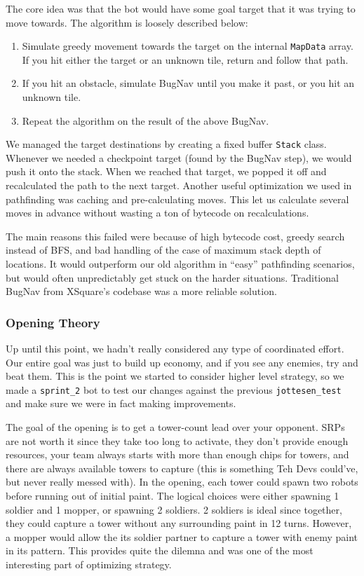 The core idea was that the bot would have some goal target that it was trying to move towards. The algorithm is loosely described below:
\begin{enumerate}
  \item Simulate greedy movement towards the target on the internal \verb|MapData| array. If you hit either the target or an unknown tile, return and follow that path.
  \item If you hit an obstacle, simulate BugNav until you make it past, or you hit an unknown tile.
  \item Repeat the algorithm on the result of the above BugNav.
\end{enumerate}
We managed the target destinations by creating a fixed buffer \verb|Stack| class. Whenever we needed a checkpoint target (found by the BugNav step), we would push it onto the stack. When we reached that target, we popped it off and recalculated the path to the next target. Another useful optimization we used in pathfinding was caching and pre-calculating moves. This let us calculate several moves in advance without wasting a ton of bytecode on recalculations.

\medskip

The main reasons this failed were because of high bytecode cost, greedy search instead of BFS, and bad handling of the case of maximum stack depth of locations. It would outperform our old algorithm in ``easy'' pathfinding scenarios, but would often unpredictably get stuck on the harder situations. Traditional BugNav from XSquare's codebase was a more reliable solution.

\subsubsection{Opening Theory}

Up until this point, we hadn't really considered any type of coordinated effort. Our entire goal was just to build up economy, and if you see any enemies, try and beat them. This is the point we started to consider higher level strategy, so we made a \verb|sprint_2| bot to test our changes against the previous \verb|jottesen_test| and make sure we were in fact making improvements.

\medskip

The goal of the opening is to get a tower-count lead over your opponent. SRPs are not worth it since they take too long to activate, they don't provide enough resources, your team always starts with more than enough chips for towers, and there are always available towers to capture (this is something Teh Devs could've, but never really messed with). In the opening, each tower could spawn two robots before running out of initial paint. The logical choices were either spawning 1 soldier and 1 mopper, or spawning 2 soldiers. 2 soldiers is ideal since together, they could capture a tower without any surrounding paint in 12 turns. However, a mopper would allow the its soldier partner to capture a tower with enemy paint in its pattern. This provides quite the dilemna and was one of the most interesting part of optimizing strategy. 

